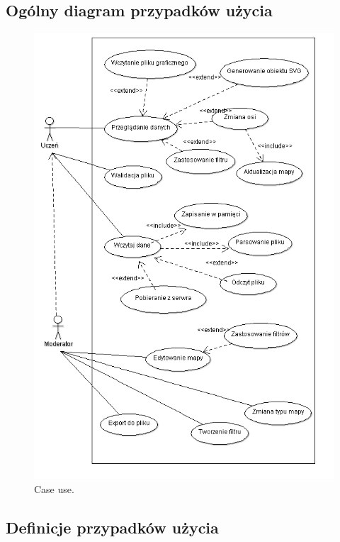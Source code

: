 \subsection{Ogólny diagram przypadków użycia}
\label{sec:diagramcaseuse}


\begin{center}
\begin{figure}[H]
\centering
     \includegraphics[origin=c,width=130mm]{ge/smieci/caseUse.png}
      \caption{Case use.}
       \label{fig:caseuse}
\end{figure}
\end{center}

\subsection{Definicje przypadków użycia}
\label{sec:defCaseuse}

